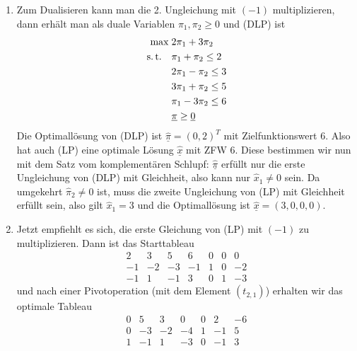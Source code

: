 \documentclass[11pt,german,a4paper,parskip=half-]{scrartcl}
\renewcommand{\u}[1]{\ensuremath{\underline{#1}}} %
\begin{document}
\begin{solution}
 \begin{enumerate}
  \item Zum Dualisieren kann man die 2. Ungleichung mit $(-1)$ multiplizieren, dann erhält man als duale Variablen $\pi_1, \pi_2 \geq 0$ und (DLP) ist
\begin{align*}
 \max\;&2\pi_1 + 3 \pi_2\\
\st\quad&\pi_1+\pi_2 \leq 2\\
&2\pi_1 -\pi_2 \leq 3\\
&3 \pi_1 + \pi_2 \leq 5\\
&\pi_1 - 3\pi_2 \leq 6\\
&\u \pi \geq \u 0
\end{align*}
Die Optimallösung von (DLP) ist $\hat{\u{\pi}} = (0,2)^T$ mit Zielfunktionswert $6$. Also hat auch (LP) eine optimale Lösung $\hat{\u x}$ mit ZFW $6$. Diese bestimmen wir nun mit dem Satz vom komplementären
Schlupf: $\hat{\u \pi}$ erfüllt nur die erste Ungleichung von (DLP) mit Gleichheit, also kann nur $\hat x_1 \neq 0$ sein. Da umgekehrt $\hat\pi_2 \neq 0$ ist, muss die zweite Ungleichung von (LP) mit Gleichheit
erfüllt sein, also gilt $\hat x_1 = 3$ und die Optimallösung ist $\u{\hat x} = (3,0,0,0)$.
\item Jetzt empfiehlt es sich, die erste Gleichung von (LP) mit $(-1)$ zu multiplizieren. Dann ist das Starttableau
\[\begin{array}{rrrrrr|r}
   2&3&5&6&0&0&0\\\hline
   -1&-2&-3&-1&1&0&-2\\
   -1&1&-1&3&0&1&-3
  \end{array}\]
und nach einer Pivotoperation (mit dem Element $(t_{2,1})$) erhalten wir das optimale Tableau
\[\begin{array}{rrrrrr|r}
   0&5&3&0&0&2&-6\\\hline
   0&-3&-2&-4&1&-1&5\\
   1&-1&1&-3&0&-1&3
  \end{array}\]
 \end{enumerate}
\end{solution}
\end{document}
